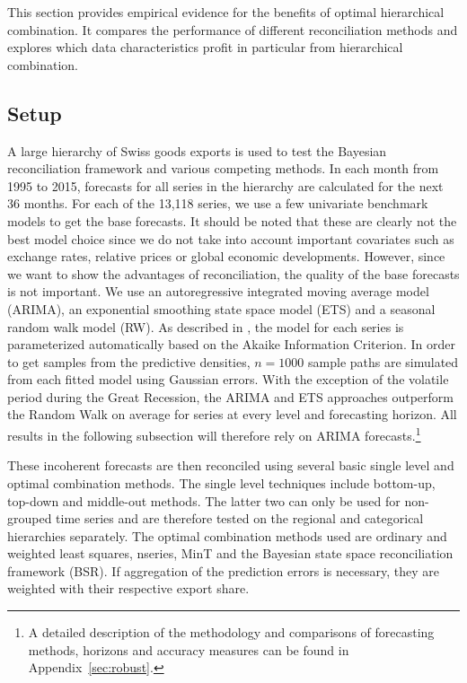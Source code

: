 \documentclass[a4paper,fleqn,11pt]{article}
\begin{document}
This section provides empirical evidence for the benefits of optimal hierarchical combination. It compares the performance of different reconciliation methods and explores which data characteristics profit in particular from hierarchical combination.

\subsection{Setup}

A large hierarchy of Swiss goods exports is used to test the Bayesian reconciliation framework and various competing methods. In each month from 1995 to 2015, forecasts for all series in the hierarchy are calculated for the next 36 months. For each of the 13,118 series, we use a few univariate benchmark models to get the base forecasts. It should be noted that these are clearly not the best model choice since we do not take into account important covariates such as exchange rates, relative prices or global economic developments. However, since we want to show the advantages of reconciliation, the quality of the base forecasts is not important. We use an autoregressive integrated moving average model (ARIMA), an exponential smoothing state space model (ETS) and a seasonal random walk model (RW). As described in \cite{Hyndman2008}, the model for each series is parameterized automatically based on the Akaike Information Criterion. In order to get samples from the predictive densities, $n = 1000$ sample paths are simulated from each fitted model using Gaussian errors. With the exception of the volatile period during the Great Recession, the ARIMA and ETS approaches outperform the Random Walk on average for series at every level and forecasting horizon. All results in the following subsection will therefore rely on ARIMA forecasts.\footnote{A detailed description of the methodology and comparisons of forecasting methods, horizons and accuracy measures can be found in Appendix~\ref{sec:robust}.}

These incoherent forecasts are then reconciled using several basic single level and optimal combination methods. The single level techniques include bottom-up, top-down and middle-out methods. The latter two can only be used for non-grouped time series and are therefore tested on the regional and categorical hierarchies separately. The optimal combination methods used are ordinary and weighted least squares, nseries, MinT and the Bayesian state space reconciliation framework (BSR). If aggregation of the prediction errors is necessary, they are weighted with their respective export share.
\end{document}
